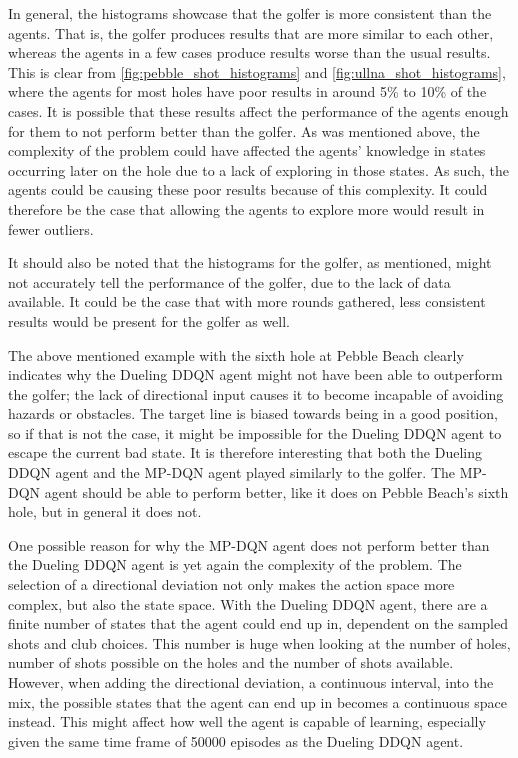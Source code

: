 \documentclass{kththesis}
\begin{document}
In general, the histograms showcase that the golfer is more consistent than the agents. That is, the golfer produces results that are more similar to each other, whereas the agents in a few cases produce results worse than the usual results. This is clear from \autoref{fig:pebble_shot_histograms} and \autoref{fig:ullna_shot_histograms}, where the agents for most holes have poor results in around 5\% to 10\% of the cases. It is possible that these results affect the performance of the agents enough for them to not perform better than the golfer. As was mentioned above, the complexity of the problem could have affected the agents' knowledge in states occurring later on the hole due to a lack of exploring in those states. As such, the agents could be causing these poor results because of this complexity. It could therefore be the case that allowing the agents to explore more would result in fewer outliers.

It should also be noted that the histograms for the golfer, as mentioned, might not accurately tell the performance of the golfer, due to the lack of data available. It could be the case that with more rounds gathered, less consistent results would be present for the golfer as well. 

The above mentioned example with the sixth hole at Pebble Beach clearly indicates why the Dueling DDQN agent might not have been able to outperform the golfer; the lack of directional input causes it to become incapable of avoiding hazards or obstacles. The target line is biased towards being in a good position, so if that is not the case, it might be impossible for the Dueling DDQN agent to escape the current bad state. It is therefore interesting that both the Dueling DDQN agent and the MP-DQN agent played similarly to the golfer. The MP-DQN agent should be able to perform better, like it does on Pebble Beach's sixth hole, but in general it does not. 

One possible reason for why the MP-DQN agent does not perform better than the Dueling DDQN agent is yet again the complexity of the problem. The selection of a directional deviation not only makes the action space more complex, but also the state space. With the Dueling DDQN agent, there are a finite number of states that the agent could end up in, dependent on the sampled shots and club choices. This number is huge when looking at the number of holes, number of shots possible on the holes and the number of shots available. However, when adding the directional deviation, a continuous interval, into the mix, the possible states that the agent can end up in becomes a continuous space instead. This might affect how well the agent is capable of learning, especially given the same time frame of 50000 episodes as the Dueling DDQN agent.
\end{document}
